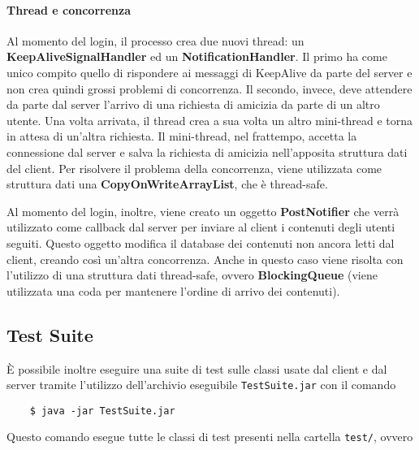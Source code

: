 \documentclass[11pt]{article}
\begin{document}
\paragraph{Thread e concorrenza} Al momento del login, il processo crea due
nuovi thread: un {\bf KeepAliveSignalHandler} ed un {\bf NotificationHandler}.
Il primo ha come unico compito quello di rispondere ai messaggi di KeepAlive da
parte del server e non crea quindi grossi problemi di concorrenza. Il secondo,
invece, deve attendere da parte dal server l'arrivo di una richiesta di amicizia
da parte di un altro utente. Una volta arrivata, il thread crea a sua volta un
altro mini-thread e torna in attesa di un'altra richiesta. Il mini-thread, nel
frattempo, accetta la connessione dal server e salva la richiesta di amicizia
nell'apposita struttura dati del client. Per risolvere il problema della
concorrenza, viene utilizzata come struttura dati una
{\bf CopyOnWriteArrayList}, che è thread-safe.

Al momento del login, inoltre, viene creato un oggetto {\bf PostNotifier} che
verrà utilizzato come callback dal server per inviare al client i contenuti
degli utenti seguiti. Questo oggetto modifica il database dei contenuti non
ancora letti dal client, creando così un'altra concorrenza. Anche in questo caso
viene risolta con l'utilizzo di una struttura dati thread-safe, ovvero
{\bf BlockingQueue} (viene utilizzata una coda per mantenere l'ordine di arrivo
dei contenuti).

\subsection{Test Suite}
È possibile inoltre eseguire una suite di test sulle classi usate dal client e
dal server tramite l'utilizzo dell'archivio eseguibile {\tt TestSuite.jar} con
il comando

\begin{verbatim}
	$ java -jar TestSuite.jar
\end{verbatim}

Questo comando esegue tutte le classi di test presenti nella cartella
{\tt test/}, ovvero
\end{document}
